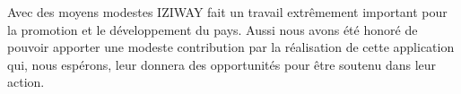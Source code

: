 Avec des moyens modestes IZIWAY fait un travail extrêmement important pour la promotion et le développement du pays. Aussi nous avons été honoré de pouvoir apporter une modeste contribution par la réalisation de cette application qui, nous espérons, leur donnera des opportunités pour être soutenu dans leur action.



















































